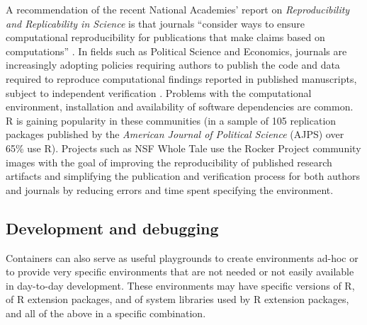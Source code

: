 A recommendation of the recent National Academies' report on
\emph{Reproducibility and Replicability in Science} is that journals
``consider ways to ensure computational reproducibility for publications
that make claims based on computations'' \citep{NASEM2019}. In fields
such as Political Science and Economics, journals are increasingly
adopting policies requiring authors to publish the code and data
required to reproduce computational findings reported in published
manuscripts, subject to independent verification
\citep{Jacoby2017,Vilhuber2019,Alvarez2018,Christian2018,Eubank2016,King1995}.
Problems with the computational environment, installation and
availability of software dependencies are common. R is gaining
popularity in these communities (in a sample of 105 replication packages
published by the \emph{American Journal of Political Science} (AJPS)
over 65\% use R). Projects such as NSF Whole Tale use the Rocker Project
community images with the goal of improving the reproducibility of
published research artifacts and simplifying the publication and
verification process for both authors and journals by reducing errors
and time spent specifying the environment.

\hypertarget{development-and-debugging}{%
\subsection{Development and debugging}\label{development-and-debugging}}

\label{development}

Containers can also serve as useful playgrounds to create environments
ad-hoc or to provide very specific environments that are not needed or
not easily available in day-to-day development. These environments may
have specific versions of R, of R extension packages, and of system
libraries used by R extension packages, and all of the above in a
specific combination.

